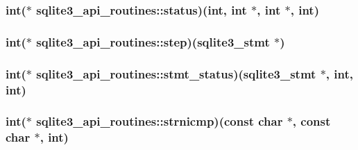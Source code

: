 \hypertarget{structsqlite3__api__routines_a0021bed44509b5085f5187db3aa43eb8}{
\subsubsection[{status}]{\setlength{\rightskip}{0pt plus 5cm}int($\ast$ sqlite3\-\_\-api\-\_\-routines\-::status)(int, int $\ast$, int $\ast$, int)}}\label{structsqlite3__api__routines_a0021bed44509b5085f5187db3aa43eb8}
\hypertarget{structsqlite3__api__routines_a40f899787bbfd866efa43f5337addbdc}{
\subsubsection[{step}]{\setlength{\rightskip}{0pt plus 5cm}int($\ast$ sqlite3\-\_\-api\-\_\-routines\-::step)({\bf sqlite3\-\_\-stmt} $\ast$)}}\label{structsqlite3__api__routines_a40f899787bbfd866efa43f5337addbdc}
\hypertarget{structsqlite3__api__routines_a965fb4dd8b649c8192bcdb436ea8ee4c}{
\subsubsection[{stmt\-\_\-status}]{\setlength{\rightskip}{0pt plus 5cm}int($\ast$ sqlite3\-\_\-api\-\_\-routines\-::stmt\-\_\-status)({\bf sqlite3\-\_\-stmt} $\ast$, int, int)}}\label{structsqlite3__api__routines_a965fb4dd8b649c8192bcdb436ea8ee4c}
\hypertarget{structsqlite3__api__routines_a1ca0d03d2340d21b5f1d2d6b60651e5c}{
\subsubsection[{strnicmp}]{\setlength{\rightskip}{0pt plus 5cm}int($\ast$ sqlite3\-\_\-api\-\_\-routines\-::strnicmp)(const char $\ast$, const char $\ast$, int)}}\label{structsqlite3__api__routines_a1ca0d03d2340d21b5f1d2d6b60651e5c}
